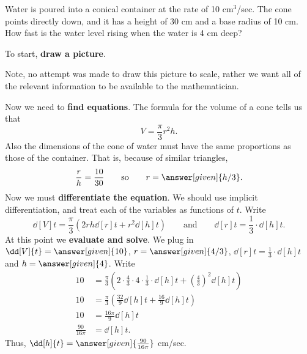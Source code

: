 \documentclass{ximera}
\begin{document}
\begin{example}
Water is poured into a conical container at the rate of 10
cm${}^3$/sec.  The cone points directly down, and it has a height of
30 cm and a base radius of 10 cm.  How fast is the water level rising
when the water is 4 cm deep?

\begin{explanation}
To start, \textbf{draw a picture}.
\begin{image}
\end{image}
Note, no attempt was made to draw this picture to scale, rather we
want all of the relevant information to be available to the
mathematician.

Now we need to \textbf{find equations}. The formula for the volume of
a cone tells us that
\[
V = \frac{\pi}{3} r^2 h.
\]
Also the dimensions of the cone of water must have the same
proportions as those of the container.  That is, because of similar
triangles,
\[
\frac{r}{h}=\frac{10}{30} \qquad\text{so}\qquad r=\answer[given]{h/3}.
\]  
Now we must \textbf{differentiate the equation}. We should use
implicit differentiation, and treat each of the variables as functions
of $t$. Write
\[
\dd[V]{t} = \frac{\pi}{3}\left(2rh \dd[r]{t} + r^2 \dd[h]{t}\right)
\qquad\text{and}\qquad \dd[r]{t} = \frac{1}{3}\cdot \dd[h]{t}.
\]
At this point we \textbf{evaluate and solve}. We plug in $\dd[V]{t} =
\answer[given]{10}$, $r = \answer[given]{4/3}$, $\dd[r]{t} = \frac{1}{3}\cdot \dd[h]{t}$ and
$h=\answer[given]{4}$. Write
\begin{align*}
10 &= \frac{\pi}{3}\left(2\cdot \frac{4}{3}\cdot 4 \cdot\frac{1}{3}\cdot\dd[h]{t} + \left(\frac{4}{3}\right)^2 \dd[h]{t}\right)\\
10 &= \frac{\pi}{3}\left(\frac{32}{9}\dd[h]{t} + \frac{16}{9} \dd[h]{t}\right)\\
10 &= \frac{16\pi}{9}\dd[h]{t}\\
\frac{90}{16\pi} &= \dd[h]{t}.
\end{align*}
Thus, $\dd[h]{t}=\answer[given]{\frac{90}{16\pi}}$ cm/sec.
\end{explanation}
\end{example}
\end{document}
